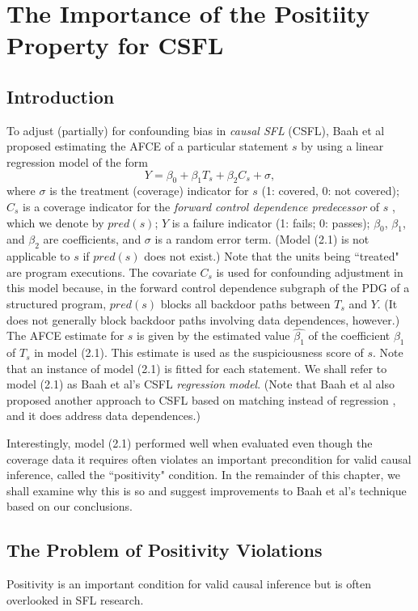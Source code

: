 \chapter{The Importance of the Positiity Property for CSFL}\label{chap:importance}

\section{Introduction}\label{sec1}
To adjust (partially) for confounding bias in {\it causal SFL} (CSFL), Baah et al proposed estimating the AFCE of a particular statement $s$ by using a linear regression model of the form
\begin{equation}\label{eq1}
Y=\beta_0+\beta_1T_s+\beta_2C_s+\sigma,
\end{equation}
where $\sigma$ is the treatment (coverage) indicator for $s$ (1: covered, 0: not covered); $C_s$ is a coverage indicator for the {\it forward control dependence predecessor} of $s$ \cite{ball1993s}, which we denote by $pred(s)$; $Y$ is a failure indicator (1: fails; 0: passes); $\beta_0$, $\beta_1$, and $\beta_2$ are coefficients, and $\sigma$ is a random error term.  (Model (2.1) is not applicable to $s$ if $pred(s)$ does not exist.)  Note that the units being ``treated" are program executions.  The covariate $C_s$ is used for confounding adjustment in this model because, in the forward control dependence subgraph of the PDG of a structured program, $pred(s)$ blocks all backdoor paths between $T_s$ and $Y$.  (It does not generally block backdoor paths involving data dependences, however.)  The AFCE estimate for $s$ is given by the estimated value $\widehat{\beta_1}$ of the coefficient $\beta_1$ of $T_s$ in model (2.1).  This estimate is used as the suspiciousness score of $s$.  Note that an instance of model (2.1) is fitted for each statement.  We shall refer to model (2.1) as Baah et al’s CSFL {\it regression model}.  (Note that Baah et al also proposed another approach to CSFL based on matching instead of regression \cite{baah2011mitigating}, and it does address data dependences.)

Interestingly, model (2.1) performed well when evaluated \cite{baah2010causal} even though the coverage data it requires often violates an important precondition for valid causal inference, called the ``positivity" condition.  In the remainder of this chapter, we shall examine why this is so and suggest improvements to Baah et al’s technique based on our conclusions.

\section{The Problem of Positivity Violations}\label{sec2}
Positivity \cite{hernan2006estimating} is an important condition for valid causal inference but is often overlooked in SFL research.

